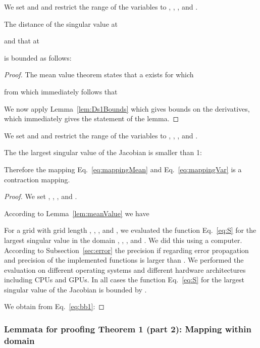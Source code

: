 \documentclass{article}
\begin{document}
\begin{lemma}
\label{lem:meanValue}
We set
 and  and
restrict the range of the variables to
,
,
, and
.

The distance of the singular value at

and that at 

is bounded as follows:

\end{lemma}
\begin{proof}


The mean value theorem states that a  exists for
which

from which immediately follows that

We now apply Lemma~\ref{lem:Ds1Bounds} which gives bounds on the
derivatives, which immediately gives the statement of the lemma.
\end{proof}

\begin{lemma}
\label{lem:sBound}
We set
 and  and
restrict the range of the variables to
,
,
, and
.

The the largest singular value of the Jacobian is smaller than 1:

Therefore the mapping  Eq.~\eqref{eq:mappingMean} 
and Eq.~\eqref{eq:mappingVar} is a contraction mapping.
\end{lemma}
\begin{proof}
We set 
,
,
, and
.





According to Lemma~\ref{lem:meanValue} we have



For a grid with grid length
,
,
, and
,
we evaluated the function  Eq.~\eqref{eq:S} 
for the largest singular value
in the domain
,
,
, and
.
We did this using a computer.
According to Subsection~\ref{sec:error}
the precision if regarding error propagation
and precision of the implemented functions is larger than
.
We performed the evaluation on different operating systems and
different hardware architectures including CPUs and GPUs.
In all cases the function  Eq.~\eqref{eq:S} for the largest singular
value of the Jacobian is bounded by .

We obtain from Eq.~\eqref{eq:bb1}:

\end{proof}


\subsubsection{Lemmata for proofing Theorem 1 (part 2): Mapping within domain}
\label{sec:maptoregion}
\end{document}
